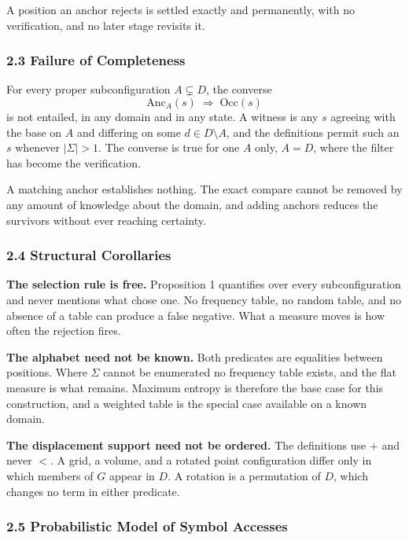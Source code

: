 A position an anchor rejects is settled exactly and permanently, with no verification, and no later stage revisits it.

\subsubsection{2.3 Failure of Completeness}

For every proper subconfiguration \(A \subsetneq D\), the converse
\[
  \mathrm{Anc}_A(s) \;\Longrightarrow\; \mathrm{Occ}(s)
\]
is not entailed, in any domain and in any state. A witness is any \(s\) agreeing with the base on \(A\) and differing on some \(d \in D \setminus A\), and the definitions permit such an \(s\) whenever \(|\Sigma| > 1\). The converse is true for one \(A\) only, \(A = D\), where the filter has become the verification.

A matching anchor establishes nothing. The exact compare cannot be removed by any amount of knowledge about the domain, and adding anchors reduces the survivors without ever reaching certainty.

\subsubsection{2.4 Structural Corollaries}

\noindent\textbf{The selection rule is free.} Proposition 1 quantifies over every subconfiguration and never mentions what chose one. No frequency table, no random table, and no absence of a table can produce a false negative. What a measure moves is how often the rejection fires.

\noindent\textbf{The alphabet need not be known.} Both predicates are equalities between positions. Where \(\Sigma\) cannot be enumerated no frequency table exists, and the flat measure is what remains. Maximum entropy is therefore the base case for this construction, and a weighted table is the special case available on a known domain.

\noindent\textbf{The displacement support need not be ordered.} The definitions use \(+\) and never \(<\). A grid, a volume, and a rotated point configuration differ only in which members of \(G\) appear in \(D\). A rotation is a permutation of \(D\), which changes no term in either predicate.

\subsubsection{2.5 Probabilistic Model of Symbol Accesses}

